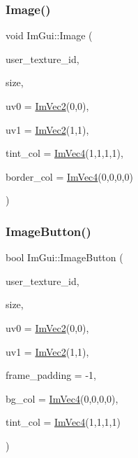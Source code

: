 \hypertarget{namespace_im_gui_ad8705ac3b718c1b2e84e7b8c34f90249}{}\label{namespace_im_gui_ad8705ac3b718c1b2e84e7b8c34f90249} 
\subsubsection{\texorpdfstring{Image()}{Image()}}
{\footnotesize\ttfamily void Im\+Gui\+::\+Image (\begin{DoxyParamCaption}\item[{Im\+Texture\+ID}]{user\+\_\+texture\+\_\+id,  }\item[{const \hyperlink{struct_im_vec2}{Im\+Vec2} \&}]{size,  }\item[{const \hyperlink{struct_im_vec2}{Im\+Vec2} \&}]{uv0 = {\ttfamily \hyperlink{struct_im_vec2}{Im\+Vec2}(0,0)},  }\item[{const \hyperlink{struct_im_vec2}{Im\+Vec2} \&}]{uv1 = {\ttfamily \hyperlink{struct_im_vec2}{Im\+Vec2}(1,1)},  }\item[{const \hyperlink{struct_im_vec4}{Im\+Vec4} \&}]{tint\+\_\+col = {\ttfamily \hyperlink{struct_im_vec4}{Im\+Vec4}(1,1,1,1)},  }\item[{const \hyperlink{struct_im_vec4}{Im\+Vec4} \&}]{border\+\_\+col = {\ttfamily \hyperlink{struct_im_vec4}{Im\+Vec4}(0,0,0,0)} }\end{DoxyParamCaption})}

\hypertarget{namespace_im_gui_ac79ef64e8b9e1db73d8237f6a999da14}{}\label{namespace_im_gui_ac79ef64e8b9e1db73d8237f6a999da14} 
\subsubsection{\texorpdfstring{Image\+Button()}{ImageButton()}}
{\footnotesize\ttfamily bool Im\+Gui\+::\+Image\+Button (\begin{DoxyParamCaption}\item[{Im\+Texture\+ID}]{user\+\_\+texture\+\_\+id,  }\item[{const \hyperlink{struct_im_vec2}{Im\+Vec2} \&}]{size,  }\item[{const \hyperlink{struct_im_vec2}{Im\+Vec2} \&}]{uv0 = {\ttfamily \hyperlink{struct_im_vec2}{Im\+Vec2}(0,0)},  }\item[{const \hyperlink{struct_im_vec2}{Im\+Vec2} \&}]{uv1 = {\ttfamily \hyperlink{struct_im_vec2}{Im\+Vec2}(1,1)},  }\item[{int}]{frame\+\_\+padding = {\ttfamily -\/1},  }\item[{const \hyperlink{struct_im_vec4}{Im\+Vec4} \&}]{bg\+\_\+col = {\ttfamily \hyperlink{struct_im_vec4}{Im\+Vec4}(0,0,0,0)},  }\item[{const \hyperlink{struct_im_vec4}{Im\+Vec4} \&}]{tint\+\_\+col = {\ttfamily \hyperlink{struct_im_vec4}{Im\+Vec4}(1,1,1,1)} }\end{DoxyParamCaption})}

